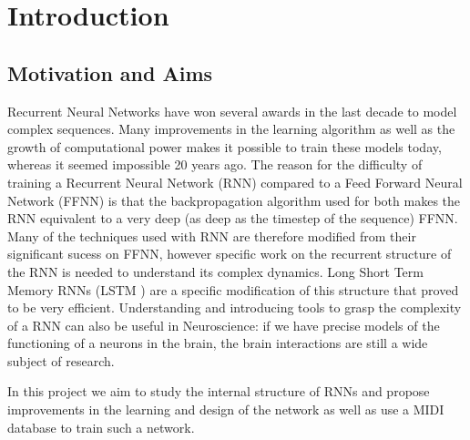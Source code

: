 
\chapter{Introduction} %

\label{Chapter 1} %




\section{Motivation and Aims}
Recurrent Neural Networks have won several awards in the last decade to model complex sequences. Many improvements in the learning algorithm as well as the growth of computational power makes it possible to train these models today, whereas it seemed impossible 20 years ago. The reason for the difficulty of training a Recurrent Neural Network (RNN) compared to a Feed Forward Neural Network (FFNN) is that the backpropagation algorithm used for both makes the RNN equivalent to a very deep (as deep as the timestep of the sequence) FFNN. Many of the techniques used with RNN are therefore modified from their significant sucess on FFNN, however specific work on the recurrent structure of the RNN is needed to understand its complex dynamics. Long Short Term Memory RNNs (LSTM \cite{hochreiter1997long}) are a specific modification of this structure that proved to be very efficient. Understanding and introducing tools to grasp the complexity of a RNN can also be useful in Neuroscience: if we have precise models of the functioning of a neurons in the brain, the brain interactions are still a wide subject of research.   

In this project we aim to study the internal structure of RNNs and propose improvements in the learning and design of the network as well as use a MIDI database to train such a network. 

